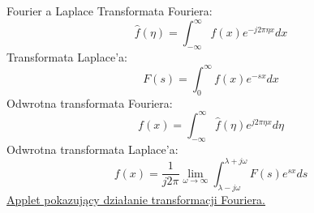 \begin{frame}{Fourier a Laplace}
	Transformata Fouriera:
	\begin{equation*}
		\hat{f}(\eta) = \int_{-\infty}^{\infty} f(x) e^{-j 2 \pi \eta x} dx
	\end{equation*}
	Transformata Laplace'a:
	\begin{equation*}
		F(s) = \int_{0}^{\infty} f(x) e^{-sx} dx
	\end{equation*}
	Odwrotna transformata Fouriera:
	\begin{equation*}
		f(x) = \int_{-\infty}^{\infty} \hat{f}(\eta) e^{j 2 \pi \eta x} d\eta
	\end{equation*}
	Odwrotna transformata Laplace'a:
	\begin{equation*}
		f(x) = \frac{1}{j 2 \pi} \lim_{\omega \rightarrow \infty} \int_{\lambda-j\omega}^{\lambda+j\omega} F(s) e^{sx} ds
	\end{equation*}
	\href{https://www.falstad.com/fourier/Fourier.html}{Applet pokazujący działanie transformacji Fouriera.}
\end{frame}